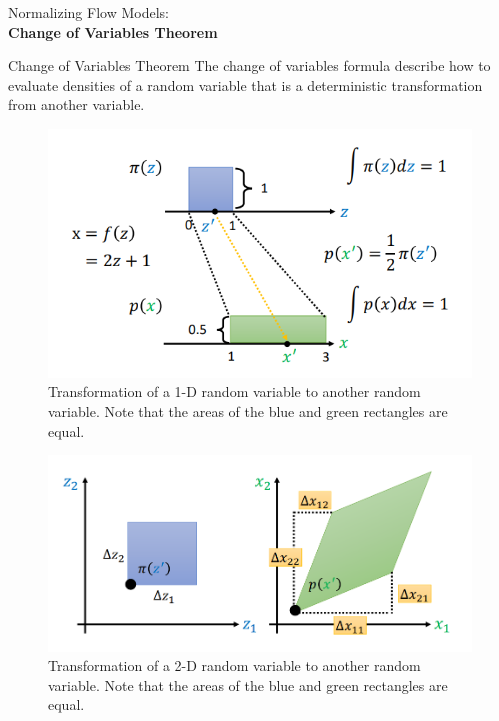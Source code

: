 \begin{frame}[allowframebreaks]{}
    \LARGE Normalizing Flow Models: \\[1.5ex] \textbf{Change of Variables Theorem}
\end{frame}

\begin{frame}[allowframebreaks]{Change of Variables Theorem}
The change of variables formula describe how to evaluate densities of a random variable that is a deterministic transformation from another variable.
\begin{figure}
    \centering
        \includegraphics[height=0.6\textheight, width=\textwidth, keepaspectratio]{images/norm-flow/change_var.png}
        \caption*{Transformation of a 1-D random variable to another random variable. Note that the areas of the blue and green rectangles are equal.}
\end{figure}

\framebreak
\begin{figure}
    \centering
    \includegraphics[height=0.7\textheight, width=\textwidth, keepaspectratio]{images/norm-flow/change_var_2.png}
    \caption*{Transformation of a 2-D random variable to another random variable. Note that the areas of the blue and green rectangles are equal.}
\end{figure}


\end{frame}
